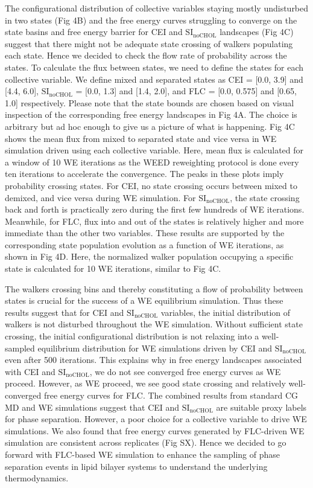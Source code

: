 \documentclass{biophys-new}
\begin{document}
The configurational distribution of collective variables staying mostly undisturbed in two states (Fig 4B) and
the free energy curves struggling to converge on the state basins and free energy barrier for CEI and $\text{SI}_{\text{noCHOL}}$ landscapes (Fig 4C) 
suggest that there might not be adequate state crossing of walkers populating each state.
Hence we decided to check the flow rate of probability across the states.
To calculate the flux between states, we need to define the states for each collective variable.
We define mixed and separated states as CEI = [0.0, 3.9] and [4.4, 6.0], $\text{SI}_{\text{noCHOL}}$ = [0.0, 1.3] and [1.4, 2.0], and FLC = [0.0, 0.575] and [0.65, 1.0] respectively.
Please note that the state bounds are chosen based on visual inspection of the corresponding free energy landscapes in Fig 4A.
The choice is arbitrary but ad hoc enough to give us a picture of what is happening. 
Fig 4C shows the mean flux from mixed to separated state and vice versa in WE simulation driven using each collective variable.
Here, mean flux is calculated for a window of 10 WE iterations as the WEED reweighting protocol is done every ten iterations to accelerate the convergence.
The peaks in these plots imply probability crossing states.
For CEI, no state crossing occurs between mixed to demixed, and vice versa during WE simulation.
For $\text{SI}_{\text{noCHOL}}$, the state crossing back and forth is practically zero during the first few hundreds of WE iterations.
Meanwhile, for FLC, flux into and out of the states is relatively higher and more immediate than the other two variables.
These results are supported by the corresponding state population evolution as a function of WE iterations, as shown in Fig 4D.
Here, the normalized walker population occupying a specific state is calculated for 10 WE iterations, similar to Fig 4C.

The walkers crossing bins and thereby constituting a flow of probability between states is crucial for the success of a WE equilibrium simulation\cite{Zuckerman2017}.
Thus these results suggest that for CEI and $\text{SI}_{\text{noCHOL}}$ variables, the initial distribution of walkers is not disturbed throughout the WE simulation.
Without sufficient state crossing, the initial configurational distribution is not relaxing into a well-sampled equilibrium distribution for WE simulations driven by CEI and $\text{SI}_{\text{noCHOL}}$ even after 500 iterations. 
This explains why in free energy landscapes associated with CEI and $\text{SI}_{\text{noCHOL}}$, we do not see converged free energy curves as WE proceed.
However, as WE proceed, we see good state crossing and relatively well-converged free energy curves for FLC. 
The combined results from standard CG MD and WE simulations suggest that CEI and $\text{SI}_{\text{noCHOL}}$ are suitable proxy labels for phase separation. However, a poor choice for a collective variable to drive WE simulations.
We also found that free energy curves generated by FLC-driven WE simulation are consistent across replicates (Fig SX).
Hence we decided to go forward with FLC-based WE simulation to enhance the sampling of phase separation events in lipid bilayer systems to understand the underlying thermodynamics.
\\ 
\end{document}
